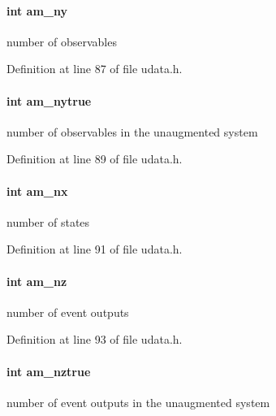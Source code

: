 \paragraph[{am\+\_\+ny}]{\setlength{\rightskip}{0pt plus 5cm}int am\+\_\+ny}\label{struct_user_data_a1c8d4eb301c60c34dc4870faca7ce5a4}
number of observables 

Definition at line 87 of file udata.\+h.

\hypertarget{struct_user_data_a52aef12adf85a9a7361e79608bcf0e91}{}
\paragraph[{am\+\_\+nytrue}]{\setlength{\rightskip}{0pt plus 5cm}int am\+\_\+nytrue}\label{struct_user_data_a52aef12adf85a9a7361e79608bcf0e91}
number of observables in the unaugmented system 

Definition at line 89 of file udata.\+h.

\hypertarget{struct_user_data_a00ba9cf99f8f02b663241bb76b76ce96}{}
\paragraph[{am\+\_\+nx}]{\setlength{\rightskip}{0pt plus 5cm}int am\+\_\+nx}\label{struct_user_data_a00ba9cf99f8f02b663241bb76b76ce96}
number of states 

Definition at line 91 of file udata.\+h.

\hypertarget{struct_user_data_af6f8dfb3615c37e31bc8a1b232d2c99e}{}
\paragraph[{am\+\_\+nz}]{\setlength{\rightskip}{0pt plus 5cm}int am\+\_\+nz}\label{struct_user_data_af6f8dfb3615c37e31bc8a1b232d2c99e}
number of event outputs 

Definition at line 93 of file udata.\+h.

\hypertarget{struct_user_data_ae8335840fdbd8b91daef2c0affee61dc}{}
\paragraph[{am\+\_\+nztrue}]{\setlength{\rightskip}{0pt plus 5cm}int am\+\_\+nztrue}\label{struct_user_data_ae8335840fdbd8b91daef2c0affee61dc}
number of event outputs in the unaugmented system 

